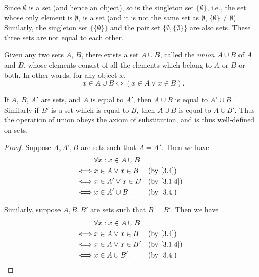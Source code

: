 \begin{eg}\label{3.1.10}
  Since \(\emptyset\) is a set (and hence an object), so is the singleton set \(\{\emptyset\}\), i.e., the set whose only element is \(\emptyset\), is a set (and it is not the same set as \(\emptyset\), \(\{\emptyset\} \neq \emptyset\)).
  Similarly, the singleton set \(\{\{\emptyset\}\}\) and the pair set \(\{\emptyset, \{\emptyset\}\}\) are also sets.
  These three sets are not equal to each other.
\end{eg}

\begin{ax}\label{3.4}
  Given any two sets \(A\), \(B\), there exists a set \(A \cup B\), called the \emph{union} \(A \cup B\) of \(A\) and \(B\), whose elements consist of all the elements which belong to \(A\) or \(B\) or both.
  In other words, for any object \(x\),
  \[
    x \in A \cup B \iff (x \in A \lor x \in B).
  \]
\end{ax}

\setcounter{thm}{11}
\begin{rmk}\label{3.1.12}
  If \(A\), \(B\), \(A'\) are sets, and \(A\) is equal to \(A'\), then \(A \cup B\) is equal to \(A' \cup B\).
  Similarly if \(B'\) is a set which is equal to \(B\), then \(A \cup B\) is equal to \(A \cup B'\).
  Thus the operation of union obeys the axiom of substitution, and is thus well-defined on sets.
\end{rmk}

\begin{proof}
  Suppose \(A, A', B\) are sets such that \(A = A'\).
  Then we have
  \begin{align*}
         & \forall x : x \in A \cup B                               \\
    \iff & x \in A \lor x \in B       &  & \text{(by \cref{3.4})}   \\
    \iff & x \in A' \lor x \in B      &  & \text{(by \cref{3.1.4})} \\
    \iff & x \in A' \cup B.           &  & \text{(by \cref{3.4})}
  \end{align*}

  Similarly, suppose \(A, B, B'\) are sets such that \(B = B'\).
  Then we have
  \begin{align*}
         & \forall x : x \in A \cup B                               \\
    \iff & x \in A \lor x \in B       &  & \text{(by \cref{3.4})}   \\
    \iff & x \in A \lor x \in B'      &  & \text{(by \cref{3.1.4})} \\
    \iff & x \in A \cup B'.           &  & \text{(by \cref{3.4})}
  \end{align*}
\end{proof}

